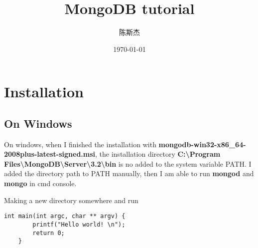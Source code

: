 \documentclass[UTF8]{ctexart}
\title{MongoDB tutorial}
\author{陈斯杰}
\date{\today}
\begin{document}
	\maketitle
	\section{Installation}
	\subsection{On Windows}
	On windows, when I finished the installation with \textbf{mongodb-win32-x86\_64-2008plus-latest-signed.msi}, the installation directory \textbf{C:\textbackslash Program Files\textbackslash MongoDB\textbackslash Server\textbackslash 3.2\textbackslash bin} is no added to the system variable PATH. I added the directory path to PATH manually, then I am able to run \textbf{mongod} and \textbf{mongo} in cmd console.
    
	Making a new directory somewhere and run 	

	\begin{lstlisting}[language={[ANSI]C},keywordstyle=\color{blue!70},commentstyle=\color{red!50!green!50!blue!50},frame=shadowbox, rulesepcolor=\color{red!20!green!20!blue!20}] 
	int main(int argc, char ** argv) { 
		printf("Hello world! \n"); 
		return 0; 
	} 
	\end{lstlisting} 
\end{document}
